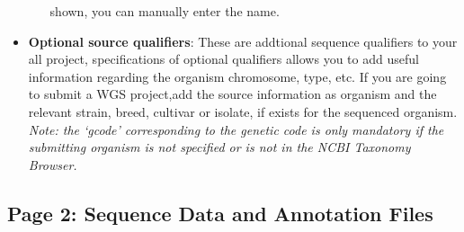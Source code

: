 \begin{itemize}
\begin{itemize}
 		shown, you can manually enter the name.
	\end{itemize}
  \item \textbf{Optional source qualifiers}: These are addtional sequence
  qualifiers to your all project, specifications of optional qualifiers allows
  you to add useful information regarding the organism chromosome, type, etc.
  If you are going to submit a WGS project,add the source information as
  organism and the relevant strain, breed, cultivar or isolate, if exists
  for the sequenced organism.
  \textit{Note: the `gcode' corresponding to the genetic code is only mandatory
  if the submitting organism is not specified or is not in the  NCBI Taxonomy Browser.}
\end{itemize}


\subsection {Page 2: Sequence Data and Annotation Files}
